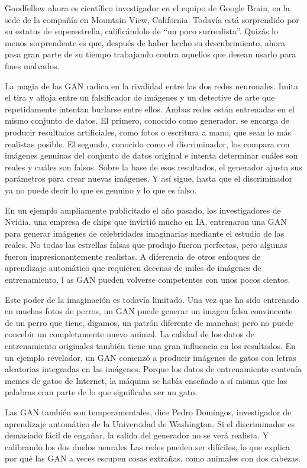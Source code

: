 \documentclass[a4paper]{article}
\begin{document}
Goodfellow ahora es científico investigador en el equipo de Google Brain, en la sede de la 
compañía en Mountain View, California. Todavía está sorprendido por su estatus de superestrella, 
calificándolo de ``un poco surrealista''. Quizás lo menos sorprendente es que, después de 
haber hecho su descubrimiento, ahora pasa gran parte de su tiempo trabajando contra aquellos 
que desean usarlo para fines malvados.

La magia de las GAN radica en la rivalidad entre las dos redes neuronales. Imita el tira 
y afloja entre un falsificador de imágenes y un detective de arte que repetidamente intentan 
burlarse entre ellos. Ambas redes están entrenadas en el mismo conjunto de datos. El primero, 
conocido como generador, se encarga de producir resultados artificiales, como fotos o escritura 
a mano, que sean lo más realistas posible. El segundo, conocido como el discriminador, los 
compara con imágenes genuinas del conjunto de datos original e intenta determinar cuáles son 
reales y cuáles son falsos. Sobre la base de esos resultados, el generador ajusta sus parámetros 
para crear nuevas imágenes. Y así sigue, hasta que el discriminador ya no puede decir lo que es 
genuino y lo que es falso.

En un ejemplo ampliamente publicitado el año pasado, los investigadores de Nvidia, una empresa 
de chips que invirtió mucho en IA, entrenaron una GAN para generar imágenes de celebridades 
imaginarias mediante el estudio de las reales. No todas las estrellas falsas que produjo 
fueron perfectas, pero algunas fueron impresionantemente realistas. A diferencia de otros 
enfoques de aprendizaje automático que requieren decenas de miles de imágenes de entrenamiento, l
as GAN pueden volverse competentes con unos pocos cientos.

Este poder de la imaginación es todavía limitado. Una vez que ha sido entrenado en muchas fotos 
de perros, un GAN puede generar un imagen falsa convincente de un perro que tiene, digamos, 
un patrón diferente de manchas; pero no puede concebir un completamente nuevo animal. La calidad 
de los datos de entrenamiento originales también tiene una gran influencia en los resultados. 
En un ejemplo revelador, un GAN comenzó a producir imágenes de gatos con letras aleatorias 
integradas en las imágenes. Porque los datos de entrenamiento contenía memes de gatos de Internet, 
la máquina se había enseñado a sí misma que las palabras eran parte de lo que significaba ser un 
gato.

Las GAN también son temperamentales, dice Pedro Domingos, investigador de aprendizaje automático 
de la Universidad de Washington. Si el discriminador es demasiado fácil de engañar, la salida 
del generador no se verá realista. Y calibrando los dos duelos neurales Las redes pueden ser 
difíciles, lo que explica por qué las GAN a veces escupen cosas extrañas, como animales con 
dos cabezas.
\end{document}
